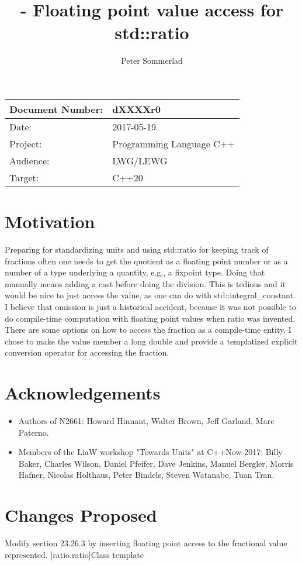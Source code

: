 \documentclass[ebook,11pt,article]{memoir}
\title{\papernumber{} - Floating point value access for std::ratio}
\author{Peter Sommerlad}
\date{\paperdate}                        %
\newcommand{\papernumber}{dXXXXr0}
\newcommand{\paperdate}{2017-05-19}
\begin{document}
\maketitle
\begin{tabular}[t]{|l|l|}\hline 
Document Number:& \papernumber  \\\hline
Date: & \paperdate \\\hline
Project: & Programming Language C++\\\hline 
Audience: & LWG/LEWG\\\hline
Target: & C++20\\\hline
\end{tabular}

\chapter{Motivation}

Preparing for standardizing units and using std::ratio for keeping track of fractions often one needs to get the quotient as a floating point number or as a number of a type underlying a quantity, e.g., a fixpoint type. Doing that manually means adding a cast before doing the division. This is tedious and it would be nice to just access the value, as one can do with std::integral_constant. I believe that omission is just a historical accident, because it was not possible to do compile-time computation with floating point values when ratio was invented. There are some options on how to access the fraction as a compile-time entity. I chose to make the value member a long double and provide a templatized explicit conversion operator for accessing the fraction.

\chapter{Acknowledgements}
\begin{itemize}
\item Authors of N2661: Howard Hinnant, Walter Brown, Jeff Garland, Marc Paterno.
\item Members of the LiaW workshop "Towards Units" at C++Now 2017: Billy Baker, Charles Wilson, Daniel Pfeifer, Dave Jenkins, Manuel Bergler, Morris Hafner, Nicolas Holthaus, Peter Bindels, Steven Watanabe, Tuan Tran.

\end{itemize}

\newpage
\chapter{Changes Proposed}
Modify section 23.26.3 by inserting floating point access to the fractional value represented.
[ratio.ratio]{Class template }
\end{document}
